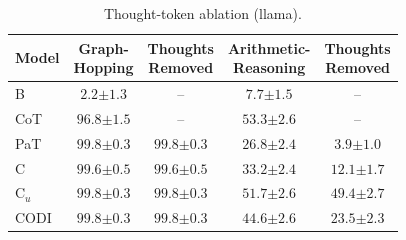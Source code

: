 \begin{table}[!t]
\centering
\small
\setlength{\tabcolsep}{3pt}
\begin{tabular}{lcc|cc}
\toprule
Model & \makecell{Graph- \\ Hopping} & \makecell{Thoughts \\ Removed} & \makecell{Arithmetic- \\ Reasoning} & \makecell{Thoughts \\ Removed} \\
\midrule
B & $2.2 {\scriptstyle \pm 1.3}$ & -- & $7.7 {\scriptstyle \pm 1.5}$ & -- \\
CoT & $96.8 {\scriptstyle \pm 1.5}$ & -- & $53.3 {\scriptstyle \pm 2.6}$ & -- \\
PaT & $99.8 {\scriptstyle \pm 0.3}$ & $99.8 {\scriptstyle \pm 0.3}$ & $26.8 {\scriptstyle \pm 2.4}$ & $3.9 {\scriptstyle \pm 1.0}$ \\
C & $99.6 {\scriptstyle \pm 0.5}$ & $99.6 {\scriptstyle \pm 0.5}$ & $33.2 {\scriptstyle \pm 2.4}$ & $12.1 {\scriptstyle \pm 1.7}$ \\
C$_u$ & $99.8 {\scriptstyle \pm 0.3}$ & $99.8 {\scriptstyle \pm 0.3}$ & $51.7 {\scriptstyle \pm 2.6}$ & $49.4 {\scriptstyle \pm 2.7}$ \\
CODI & $99.8 {\scriptstyle \pm 0.3}$ & $99.8 {\scriptstyle \pm 0.3}$ & $44.6 {\scriptstyle \pm 2.6}$ & $23.5 {\scriptstyle \pm 2.3}$ \\
\bottomrule
\end{tabular}
\caption{Thought-token ablation (llama).}
\label{tab:ablation_main_llama}
\end{table}